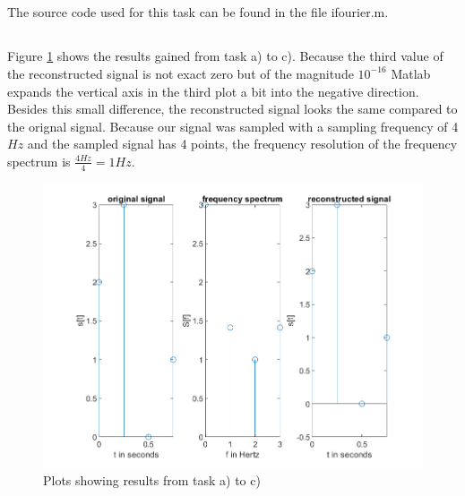 \documentclass{article}
\begin{document}
\subsection{}
The source code used for this task can be found in the file ifourier.m.

\subsection{}
Figure \ref{results} shows the results gained from task a) to c). Because the third value of the reconstructed signal is not exact zero but of the magnitude $10^{-16}$ Matlab expands the vertical axis in the third plot a bit into the negative direction. Besides this small difference, the reconstructed signal looks the same compared to the orignal signal. Because our signal was sampled with a sampling frequency of 4$\si{Hz}$ and the sampled signal has 4 points, the frequency resolution of the frequency spectrum is $\frac{4\si{Hz}}{4} = 1\si{Hz}$.

\begin{figure}[H]
	\begin{center}
		\includegraphics[width=\textwidth]{./images/figure_d.png}
		\caption{Plots showing results from task a) to c)} 
    \label{results}
	\end{center}
\end{figure}

\clearpage
\end{document}
